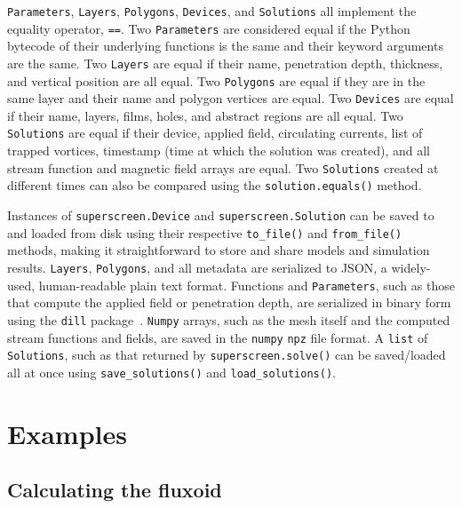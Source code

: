 \documentclass[final,3p,times,twocolumn]{elsarticle}
\newcommand{\inline}[1]{\texttt{#1}\xspace}
\begin{document}
\inline{Parameters}, \inline{Layers}, \inline{Polygons}, \inline{Devices}, and \inline{Solutions} all implement the equality operator, \inline{==}. Two \inline{Parameters} are considered equal if the Python bytecode of their underlying functions is the same and their keyword arguments are the same. Two \inline{Layers} are equal if their name, penetration depth, thickness, and vertical position are all equal. Two \inline{Polygons} are equal if they are in the same layer and their name and polygon vertices are equal. Two \inline{Devices} are equal if their name, layers, films, holes, and abstract regions are all equal. Two \inline{Solutions} are equal if their device, applied field, circulating currents, list of trapped vortices, timestamp (time at which the solution was created), and all stream function and magnetic field arrays are equal. Two \inline{Solutions} created at different times can also be compared using the  \inline{solution.equals()} method.

Instances of \inline{superscreen.Device} and \inline{superscreen.Solution} can be saved to and loaded from disk using their respective \inline{to_file()} and \inline{from_file()} methods, making it straightforward to store and share models and simulation results. \inline{Layers}, \inline{Polygons}, and all metadata are serialized to JSON, a widely-used, human-readable plain text format. Functions and \inline{Parameters}, such as those that compute the applied field or penetration depth, are serialized in binary form using the \inline{dill} package~\cite{McKerns}. \inline{Numpy} arrays, such as the mesh itself and the computed stream functions and fields, are saved in the \inline{numpy} \inline{npz} file format. A \inline{list} of \inline{Solutions}, such as that returned by \inline{superscreen.solve()} can be saved/loaded all at once using \inline{save_solutions()} and \inline{load_solutions()}.

\section{Examples}
\label{section:examples}

\subsection{Calculating the fluxoid}
\label{section:examples:fluxoid}
\end{document}
